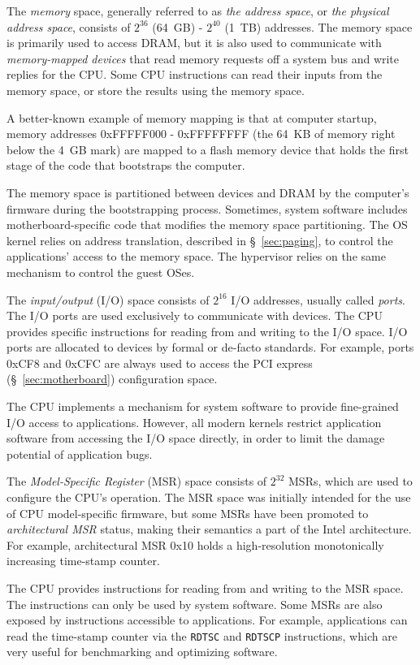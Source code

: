 The \textit{memory} space, generally referred to as \textit{the address space},
or \textit{the physical address space}, consists of $2^{36}$ (64~GB) - $2^{40}$
(1~TB) addresses. The memory space is primarily used to access DRAM, but it is
also used to communicate with \textit{memory-mapped devices} that read memory
requests off a system bus and write replies for the CPU. Some CPU instructions
can read their inputs from the memory space, or store the results using the
memory space.

A better-known example of memory mapping is that at computer startup, memory
addresses 0xFFFFF000 - 0xFFFFFFFF (the 64~KB of memory right below the 4~GB
mark) are mapped to a flash memory device that holds the first stage of the
code that bootstraps the computer.

The memory space is partitioned between devices and DRAM by the computer's
firmware during the bootstrapping process. Sometimes, system software includes
motherboard-specific code that modifies the memory space partitioning. The OS
kernel relies on address translation, described in \S~\ref{sec:paging}, to
control the applications' access to the memory space. The hypervisor relies on
the same mechanism to control the guest OSes.


The \textit{input/output} (I/O) space consists of $2^{16}$ I/O addresses,
usually called \textit{ports}. The I/O ports are used exclusively to
communicate with devices. The CPU provides specific instructions for reading
from and writing to the I/O space. I/O ports are allocated to devices by formal
or de-facto standards. For example, ports 0xCF8 and 0xCFC are always used to
access the PCI express (\S~\ref{sec:motherboard}) configuration space.

The CPU implements a mechanism for system software to provide fine-grained I/O
access to applications. However, all modern kernels restrict application
software from accessing the I/O space directly, in order to limit the damage
potential of application bugs.


The \textit{Model-Specific Register} (MSR) space consists of $2^{32}$ MSRs,
which are used to configure the CPU's operation. The MSR space was initially
intended for the use of CPU model-specific firmware, but some MSRs have been
promoted to \textit{architectural MSR} status, making their semantics a part of
the Intel architecture. For example, architectural MSR 0x10 holds a
high-resolution monotonically increasing time-stamp counter.

The CPU provides instructions for reading from and writing to the MSR space.
The instructions can only be used by system software. Some MSRs are also
exposed by instructions accessible to applications. For example, applications
can read the time-stamp counter via the \texttt{RDTSC} and \texttt{RDTSCP}
instructions, which are very useful for benchmarking and optimizing software.
